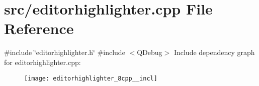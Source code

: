 \section{src/editorhighlighter.cpp File Reference}
\label{editorhighlighter_8cpp}
{\ttfamily \#include \char`\"{}editorhighlighter.\+h\char`\"{}}\newline
{\ttfamily \#include $<$Q\+Debug$>$}\newline
Include dependency graph for editorhighlighter.\+cpp\+:\nopagebreak
\begin{figure}[H]
\begin{center}
\leavevmode
\texttt{[image: editorhighlighter\_8cpp\_\_incl]}
\end{center}
\end{figure}
